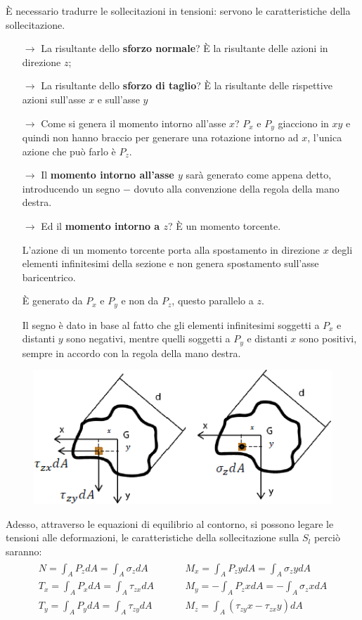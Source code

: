 È necessario tradurre le sollecitazioni in tensioni: servono le caratteristiche della sollecitazione. 
\begin{itemize}
	\item[$\rightarrow$] La risultante dello \textbf{sforzo normale}? È la risultante delle azioni in direzione $z$; 
\item[$\rightarrow$] La risultante dello \textbf{sforzo di taglio}? È la risultante delle rispettive azioni sull'asse $x$ e sull'asse $y$
\item[$\rightarrow$] Come si genera il momento intorno all'asse $x$? $P_x$ e $P_y$ giacciono in $xy$ e quindi non hanno braccio per generare una rotazione intorno ad $x$, l'unica azione che può farlo è $P_z$.
\item[$\rightarrow$] Il \textbf{momento intorno all'asse $y$} sarà generato come appena detto, introducendo un segno $-$ dovuto alla convenzione della regola della mano destra. 
\item[$\rightarrow$] Ed il \textbf{momento intorno a $z$}? È un momento torcente. 

L'azione di un momento torcente porta alla spostamento in direzione $x$ degli elementi infinitesimi della sezione e non genera spostamento sull'asse baricentrico. 

È generato da $P_x$ e $P_y$ e non da $P_z$, questo parallelo a $z$. 

Il segno è dato in base al fatto che gli elementi infinitesimi soggetti a $P_x$ e distanti $y$ sono negativi, mentre quelli soggetti a $P_y$ e distanti $x$ sono positivi, sempre in accordo con la regola della mano destra. 
\end{itemize}


\begin{figure}[H]
	\centering
	\includegraphics[width=0.5\linewidth]{Immagini_2/screenshot003}
	\label{fig:screenshot003}
\end{figure}

	Adesso, attraverso le equazioni di equilibrio al contorno, si possono legare le tensioni alle deformazioni, le caratteristiche della sollecitazione sulla $S_l$ perciò saranno:
\[\begin{matrix}
	\begin{aligned}
		N = \int_A P_zdA = \int_A \sigma_zdA  \hspace{1cm} & M_x = \int_A P_zydA = \int_A \sigma_zydA  \\
		T_x = \int_A P_xdA = \int_A \tau_{zx}dA \hspace{1cm} &  M_y = -\int_A P_zxdA = -\int_A \sigma_zxdA \\
		T_y = \int_A P_ydA = \int_A \tau_{zy}dA \hspace{1cm} &  M_z = \int_A (\tau_{zy}x -\tau_{zx}y)dA
	\end{aligned}	
\end{matrix}\]
	

